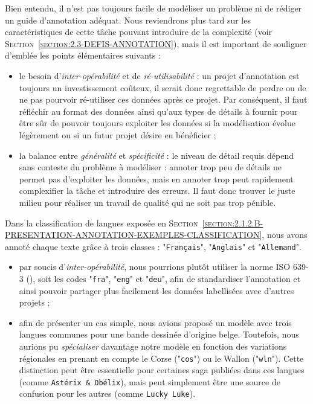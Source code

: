 			Bien entendu, il n'est pas toujours facile de modéliser un problème ni de rédiger un guide d'annotation adéquat.
			Nous reviendrons plus tard sur les caractéristiques de cette tâche pouvant introduire de la complexité (voir \textsc{Section~\ref{section:2.3-DEFIS-ANNOTATION}}), mais il est important de souligner d'emblée les points élémentaires suivants :
			\begin{itemize}
				\item le besoin d'\textit{inter-opérabilité} et de \textit{ré-utilisabilité} : un projet d'annotation est toujours un investissement coûteux, il serait donc regrettable de perdre ou de ne pas pourvoir ré-utiliser ces données après ce projet.
				Par conséquent, il faut réfléchir au format des données ainsi qu'aux types de détails à fournir pour être sûr de pouvoir toujours exploiter les données si la modélisation évolue légèrement ou si un futur projet désire en bénéficier ;
				\item la balance entre \textit{généralité} et \textit{spécificité} : le niveau de détail requis dépend sans conteste du problème à modéliser : annoter trop peu de détails ne permet pas d'exploiter les données, mais en annoter trop peut rapidement complexifier la tâche et introduire des erreurs.
				Il faut donc trouver le juste milieu pour réaliser un travail de qualité qui ne soit pas trop pénible.
			\end{itemize}
			\begin{leftBarExamples}
				Dans la classification de langues exposée en \textsc{Section~\ref{section:2.1.2.B-PRESENTATION-ANNOTATION-EXEMPLES-CLASSIFICATION}}, nous avons annoté chaque texte grâce à trois classes : "\texttt{Français}", "\texttt{Anglais}" et "\texttt{Allemand}".
				\begin{itemize}
					\item par soucis d'\textit{inter-opérabilité}, nous pourrions plutôt utiliser la norme ISO 639-3 (\cite{international-organization-for-standardization:2007:codes-representation-names}), soit les codes "\texttt{fra}", "\texttt{eng}" et "\texttt{deu}", afin de standardiser l'annotation et ainsi pouvoir partager plus facilement les données labellisées avec d'autres projets ;
					\item afin de présenter un cas simple, nous avions proposé un modèle avec trois langues communes pour une bande dessinée d'origine belge.
					Toutefois, nous aurions pu \textit{spécialiser} davantage notre modèle en fonction des variations régionales en prenant en compte le Corse ("\texttt{cos}") ou le Wallon ("\texttt{wln}").
					Cette distinction peut être essentielle pour certaines saga publiées dans ces langues (comme \texttt{Astérix \& Obélix}), mais peut simplement être une source de confusion pour les autres (comme \texttt{Lucky Luke}).
				\end{itemize}
			\end{leftBarExamples}
			
